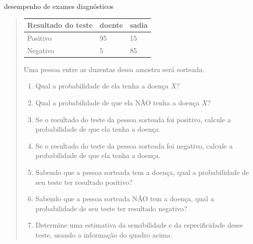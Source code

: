 \begin{task}{desempenho de exames diagnósticos}
\begin{quote}
\begin{savenotes}\sphinxattablestart
\centering
\begin{tabulary}{\linewidth}[t]{|T|T|T|}
\hline

Resultado
do teste
&
doente
&
sadia
\\
\hline
Positivo
&
95
&
15
\\
\hline
Negativo
&
5
&
85
\\
\hline
\end{tabulary}
\par
\sphinxattableend\end{savenotes}

Uma pessoa entre as duzentas dessa amostra será sorteada.
\begin{enumerate}
\item {} 
Qual a probabilidade de ela tenha a doença \(X\)?

\item {} 
Qual a probabilidade de que ela NÃO tenha a doença \(X\)?

\item {} 
Se o resultado do teste da pessoa sorteada foi positivo, calcule a probabilidade de que ela tenha a doença.

\item {} 
Se o resultado do teste da pessoa sorteada foi negativo, calcule a probabilidade de que ela tenha a doença.

\item {} 
Sabendo que a pessoa sorteada tem a doença, qual a probabilidade de seu teste ter resultado positivo?

\item {} 
Sabendo que a pessoa sorteada  NÃO tem a doença, qual a probabilidade de seu teste ter resultado negativo?

\item {} 
Determine uma estimativa da sensibilidade e da especificidade desse teste, usando a informação do quadro acima.

\end{enumerate}
\end{quote}
\end{task}

